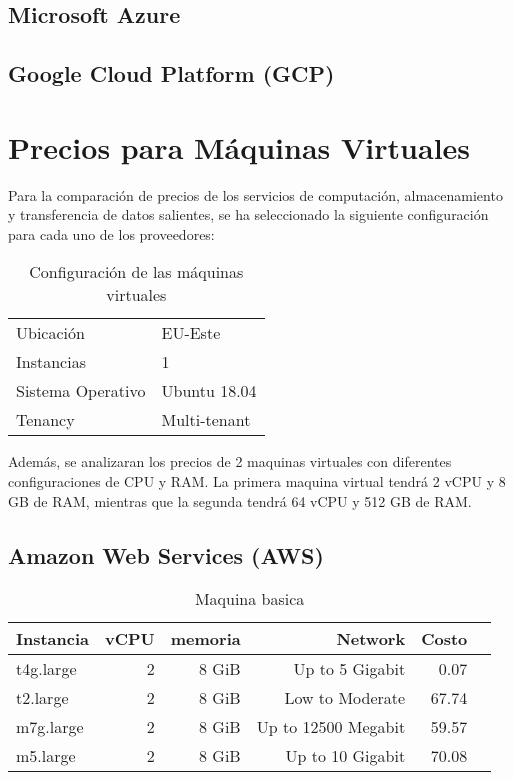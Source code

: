 \documentclass{article}
\begin{document}
\newpage

  \subsection{Microsoft Azure}
  \subsection{Google Cloud Platform (GCP)}
   


\section{Precios para Máquinas Virtuales}

Para la comparación de precios de los servicios de computación, almacenamiento y transferencia de datos salientes, se ha seleccionado la siguiente configuración para cada uno de los proveedores:

\begin{table}[!htp]
  \centering
  \caption{Configuración de las máquinas virtuales}
  \label{tab:configuracion}
  \begin{tabular}{|l|l|}
    \toprule
    Ubicación & EU-Este \\
    Instancias & 1 \\
    Sistema Operativo & Ubuntu 18.04 \\
    Tenancy & Multi-tenant \\
    \bottomrule

  \end{tabular}
\end{table}

Además, se analizaran los precios de 2 maquinas virtuales con diferentes configuraciones de CPU y RAM.
La primera maquina virtual tendrá 2 vCPU y 8 GB de RAM, mientras que la segunda tendrá 64 vCPU y 512 GB de RAM.



  \subsection{Amazon Web Services (AWS)}


  \begin{table}[!htp]\centering
\caption{Maquina basica}\label{tab: }
\scriptsize
\begin{tabular}{lrrrrr}\toprule
Instancia &vCPU &memoria &Network &Costo \\\midrule
t4g.large &2 &8 GiB &Up to 5 Gigabit &0.07 \\
t2.large &2 &8 GiB &Low to Moderate &67.74 \\
m7g.large &2 &8 GiB &Up to 12500 Megabit &59.57 \\
m5.large &2 &8 GiB &Up to 10 Gigabit &70.08 \\
\bottomrule
\end{tabular}
\end{table}
\end{document}
